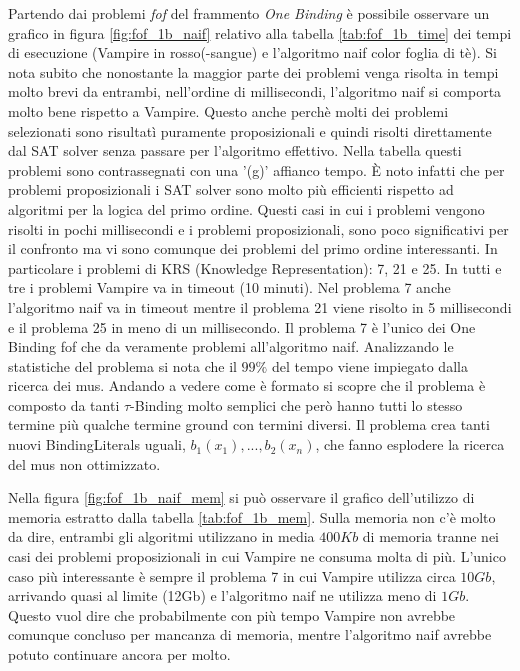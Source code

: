 \documentclass[./main.tex]{subfiles}
\begin{document}
Partendo dai problemi \textit{fof} del frammento \textit{One Binding} è possibile osservare un grafico in figura \ref{fig:fof_1b_naif}
relativo alla tabella \ref{tab:fof_1b_time} dei tempi di esecuzione (Vampire in rosso(-sangue) e l'algoritmo naif color foglia di tè). 
Si nota subito che nonostante la maggior parte dei problemi venga risolta in tempi molto brevi da entrambi, 
nell'ordine di millisecondi, l'algoritmo naif si comporta molto bene rispetto a Vampire.
Questo anche perchè molti dei problemi selezionati sono risultatì puramente proposizionali e quindi risolti direttamente dal SAT solver
senza passare per l'algoritmo effettivo.
Nella tabella questi problemi sono contrassegnati con una '(g)' affianco tempo.
È noto infatti che per problemi proposizionali i SAT solver sono molto più efficienti rispetto ad algoritmi per la logica del primo ordine.
Questi casi in cui i problemi vengono risolti in pochi millisecondi e i problemi proposizionali,
sono poco significativi per il confronto ma vi sono comunque dei problemi del primo ordine interessanti.
In particolare i problemi di KRS (Knowledge Representation): 7, 21 e 25.
In tutti e tre i problemi Vampire va in timeout (10 minuti).
Nel problema 7 anche l'algoritmo naif va in timeout
mentre il problema 21 viene risolto in 5 millisecondi e il problema 25 in meno di un millisecondo.
Il problema 7 è l'unico dei One Binding fof che da veramente problemi all'algoritmo naif.
Analizzando le statistiche del problema si nota che il $99\%$ del tempo viene impiegato dalla ricerca 
dei mus. 
Andando a vedere come è formato si scopre che il problema è composto da tanti $\tau$-Binding 
molto semplici che però hanno tutti lo stesso termine più qualche termine ground con termini diversi.
Il problema crea tanti nuovi BindingLiterals uguali, $b_1(x_1), ..., b_2(x_n)$, che fanno esplodere la ricerca del mus non ottimizzato.

Nella figura \ref{fig:fof_1b_naif_mem} si può osservare il grafico dell'utilizzo di memoria estratto dalla tabella \ref{tab:fof_1b_mem}.
Sulla memoria non c'è molto da dire, entrambi gli algoritmi utilizzano in media $400Kb$ di memoria tranne nei casi
dei problemi proposizionali in cui Vampire ne consuma molta di più. 
L'unico caso più interessante è sempre il problema 7 in cui Vampire utilizza circa $10Gb$, 
arrivando quasi al limite (12Gb) e l'algoritmo naif ne utilizza meno di $1Gb$.
Questo vuol dire che probabilmente con più tempo Vampire non avrebbe comunque concluso 
per mancanza di memoria, mentre l'algoritmo naif avrebbe potuto continuare ancora per molto.
\end{document}
